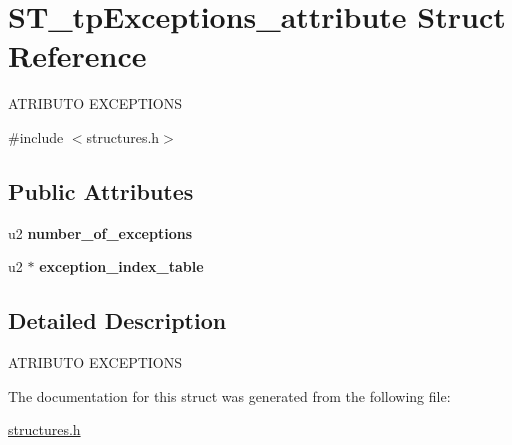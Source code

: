 \hypertarget{structST__tpExceptions__attribute}{}\section{S\+T\+\_\+tp\+Exceptions\+\_\+attribute Struct Reference}
\label{structST__tpExceptions__attribute}




 A\+T\+R\+I\+B\+U\+TO E\+X\+C\+E\+P\+T\+I\+O\+NS  




{\ttfamily \#include $<$structures.\+h$>$}

\subsection*{Public Attributes}
\begin{DoxyCompactItemize}
\item 
\mbox{\label{structST__tpExceptions__attribute_a5929a6d776ee9f5e611ad195a00722b5}} 
u2 {\bfseries number\+\_\+of\+\_\+exceptions}
\item 
\mbox{\label{structST__tpExceptions__attribute_a379689a99673363e56f40c6d3eeea86f}} 
u2 $\ast$ {\bfseries exception\+\_\+index\+\_\+table}
\end{DoxyCompactItemize}


\subsection{Detailed Description}


 A\+T\+R\+I\+B\+U\+TO E\+X\+C\+E\+P\+T\+I\+O\+NS 

The documentation for this struct was generated from the following file\+:\begin{DoxyCompactItemize}
\item 
\mbox{\hyperlink{structures_8h}{structures.\+h}}\end{DoxyCompactItemize}
